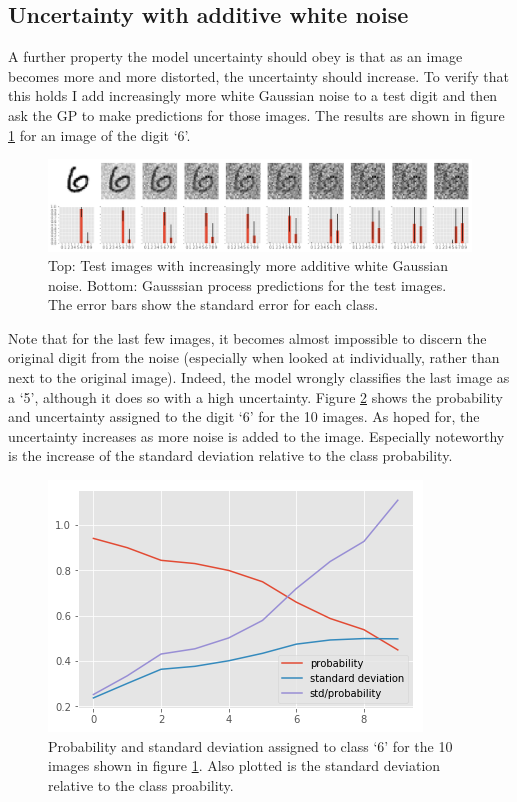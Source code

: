 \documentclass{article}
\begin{document}
\subsection{Uncertainty with additive white noise}
A further property the model uncertainty should obey is that as an image becomes more and more distorted, the uncertainty should increase. To verify that this holds I add increasingly more white Gaussian noise to a test digit and then ask the GP to make predictions for those images. The results are shown in figure \ref{fig/awgn_predictions} for an image of the digit `6'.
\begin{figure}[h]
	\centering
	\includegraphics[width=1.0\textwidth]{awgn_predictions}
	\caption{Top: Test images with increasingly more additive white Gaussian noise. Bottom: Gausssian process predictions for the test images. The error bars show the standard error for each class.}
	\label{fig/awgn_predictions}
\end{figure}
Note that for the last few images, it becomes almost impossible to discern the original digit from the noise (especially when looked at individually, rather than next to the original image). Indeed, the model wrongly classifies the last image as a `5', although it does so with a high uncertainty. Figure \ref{fig/awgn_predictions_stds} shows the probability and uncertainty assigned to the digit `6' for the 10 images. As hoped for, the uncertainty increases as more noise is added to the image. Especially noteworthy is the increase of the standard deviation relative to the class probability.
\begin{figure}[h]
	\centering
	\includegraphics[scale=0.4]{awgn_predictions_stds}
	\caption{Probability and standard deviation assigned to class `6' for the 10 images shown in figure \ref{fig/awgn_predictions}. Also plotted is the standard deviation relative to the class proability.}
	\label{fig/awgn_predictions_stds}
\end{figure}
\end{document}
